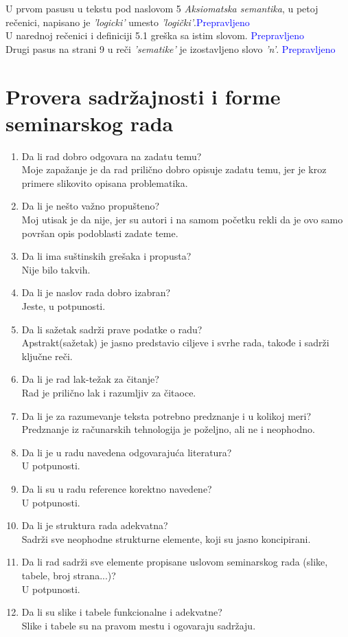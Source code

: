 \documentclass[a4paper]{report}
\newcommand{\odgovor}[1]{\textcolor{blue}{#1}}
\begin{document}
U prvom pasusu u tekstu pod naslovom 5 \emph{Aksiomatska semantika}, u petoj rečenici, napisano je \emph{'logicki'} umesto \emph{'logički'}.\odgovor{Prepravljeno}\\ U narednoj rečenici i definiciji 5.1 greška sa istim slovom. \odgovor{Prepravljeno}\\Drugi pasus na strani 9 u reči \emph{'sematike'} je izostavljeno slovo \emph{'n'}. \odgovor{Prepravljeno}\\

\section{Provera sadržajnosti i forme seminarskog rada}

\begin{enumerate}
\item Da li rad dobro odgovara na zadatu temu?\\
Moje zapažanje je da rad prilično dobro opisuje zadatu temu, jer je kroz primere slikovito opisana problematika. 
\item Da li je nešto važno propušteno?\\
Moj utisak je da nije, jer su autori i na samom početku rekli da je ovo samo površan opis podoblasti zadate teme.
\item Da li ima suštinskih grešaka i propusta?\\
Nije bilo takvih.
\item Da li je naslov rada dobro izabran?\\
Jeste, u potpunosti.
\item Da li sažetak sadrži prave podatke o radu?\\
Apstrakt(sažetak) je jasno predstavio ciljeve i svrhe rada, takođe i sadrži ključne reči.
\item Da li je rad lak-težak za čitanje?\\
Rad je prilično lak i razumljiv za čitaoce.
\item Da li je za razumevanje teksta potrebno predznanje i u kolikoj meri?\\
Predznanje iz računarskih tehnologija je poželjno, ali ne i neophodno. 
\item Da li je u radu navedena odgovarajuća literatura?\\
U potpunosti.
\item Da li su u radu reference korektno navedene?\\
U potpunosti.
\item Da li je struktura rada adekvatna?\\
Sadrži sve neophodne strukturne elemente, koji su jasno koncipirani.
\item Da li rad sadrži sve elemente propisane uslovom seminarskog rada (slike, tabele, broj strana...)?\\
U potpunosti.
\item Da li su slike i tabele funkcionalne i adekvatne?\\
Slike i tabele su na pravom mestu i ogovaraju sadržaju.
\end{enumerate}
\end{document}
